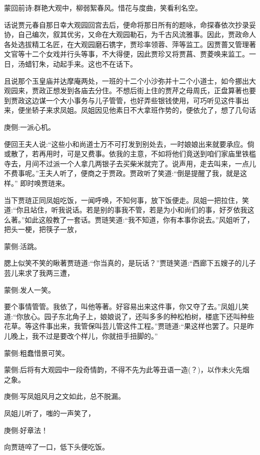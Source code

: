
\begin{parag}
    \begin{note}蒙回前诗:群艳大观中，柳弱絮春风。惜花与度曲，笑看利名空。\end{note}
\end{parag}


\begin{parag}
    话说贾元春自那日幸大观园回宫去后，便命将那日所有的题咏，命探春依次抄录妥协，自己编次，叙其优劣，又命在大观园勒石，为千古风流雅事。因此，贾政命人各处选拔精工名匠，在大观园磨石镌字，贾珍率领蓉、萍等监工。因贾蔷又管理著文官等十二个女戏并行头等事，不大得便，因此贾珍又将贾菖、贾菱唤来监工。一日，汤蜡钉朱，动起手来。这也不在话下。
\end{parag}


\begin{parag}
    且说那个玉皇庙并达摩庵两处，一班的十二个小沙弥并十二个小道士，如今挪出大观园来，贾政正想发到各庙去分住。不想后街上住的贾芹之母周氏，正盘算著也要到贾政这边谋一个大小事务与儿子管管，也好弄些银钱使用，可巧听见这件事出来，便坐轿子来求凤姐。凤姐因见他素日不大拿班作势的，便依允了，想了几句话\begin{note}庚侧:一派心机。\end{note}便回王夫人说:“这些小和尚道士万不可打发到别处去，一时娘娘出来就要承应。倘或散了，若再用时，可是又费事。依我的主意，不如将他们竟送到咱们家庙里铁槛寺去，月间不过派一个人拿几两银子去买柴米就完了。说声用，走去叫来，一点儿不费事呢。”王夫人听了，便商之于贾政。贾政听了笑道:“倒是提醒了我，就是这样。” 即时唤贾琏来。
\end{parag}


\begin{parag}
    当下贾琏正同凤姐吃饭，一闻呼唤，不知何事，放下饭便走。凤姐一把拉住，笑道:“你且站住，听我说话。若是别的事我不管，若是为小和尚们的事，好歹依我这么著。”如此这般教了一套话。贾琏笑道:“我不知道，你有本事你说去。”风姐听了，把头一梗，把筷子一放，\begin{note}蒙侧:活跳。\end{note}腮上似笑不笑的瞅著贾琏道:“你当真的，是玩话？”贾琏笑道:“西廊下五嫂子的儿子芸儿来求了我两三遭，\begin{note}蒙侧:发人一笑。\end{note}要个事情管管。我依了，叫他等著。好容易出来这件事，你又夺了去。”凤姐儿笑道:“你放心。园子东北角子上，娘娘说了，还叫多多的种松柏树，楼底下还叫种些花草。等这件事出来，我管保叫芸儿管这件工程。”贾琏道:“果这样也罢了。只是昨儿晚上，我不过是要改个样儿，你就扭手扭脚的。”\begin{note}蒙侧:粗蠢惜景可笑。\end{note}\begin{note}蒙侧:后将有大观园中一段奇情韵，不得不先为此等丑语一造(？)，以作未火先烟之象。\end{note}\begin{note}庚侧:写凤姐风月之文如此，总不脱漏。\end{note}凤姐儿听了，嗤的一声笑了，\begin{note}庚侧:好章法！\end{note}向贾琏啐了一口，低下头便吃饭。
\end{parag}


